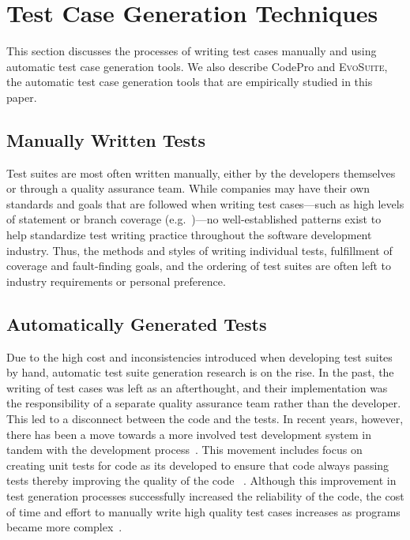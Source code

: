 
\section{Test Case Generation Techniques}
\label{sec:background}

This section discusses the processes of writing test cases manually and using automatic test case generation tools.  We also describe CodePro and \textsc{EvoSuite}, the automatic test case generation tools that are empirically studied in this paper.

\subsection{Manually Written Tests}

Test suites are most often written manually, either by the developers themselves or through a quality assurance team.  While companies may have their own standards and goals that are followed when writing test cases---such as high levels of statement or branch coverage (e.g.~\cite{DO-178B, IEC61508})---no well-established patterns exist to help standardize test writing practice throughout the software development industry. Thus, the methods and styles of writing individual tests, fulfillment of coverage and fault-finding goals, and the ordering of test suites are often left to industry requirements or personal preference.  

\subsection{Automatically Generated Tests}

Due to the high cost and inconsistencies introduced when developing test suites by hand, automatic test suite generation
research is on the rise.  In the past, the writing of test cases was left as an afterthought, and their implementation
was the responsibility of a separate quality assurance team rather than the developer.  This led to a disconnect between
the code and the tests.  In recent years, however, there has been a move towards a more involved test development system
in tandem with the development process~\cite{Gelperin:1988:GST:62959.62965}.  This movement includes focus on creating
unit tests for code as its developed to ensure that code always passing tests thereby improving the quality of the code
~\cite{Canfora:2006:EAT:1159733.1159788}.  Although this improvement in test generation processes successfully increased
the reliability of the code, the cost of time and effort to manually write high quality test cases increases as programs
became more complex~\cite{clarke1998automated}. 

